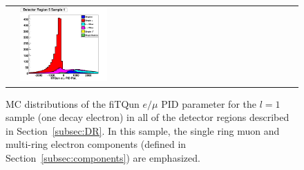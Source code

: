 \begin{figure}[h!]
\begin{tabular}{l  l  l}
  &\includegraphics[width=0.33\textwidth]{plots/mc_breakdown_comp_1_bin_5_att_0} 
\end{tabular} 
\caption{MC distributions of the fiTQun $e/\mu$ PID parameter for the $l = 1$
sample (one decay electron) in all of the detector regions described in
Section~\ref{subsec:DR}.  In this sample, the single ring muon and multi-ring
electron components (defined in Section~\ref{subsec:components}) are
emphasized.}
\label{fig:samplot1}
\end{figure}

